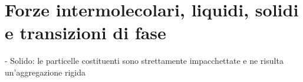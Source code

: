 \section{Forze intermolecolari, liquidi, solidi e transizioni di fase}
- Solido: le particelle costituenti sono strettamente impacchettate e ne risulta un'aggregazione rigida
